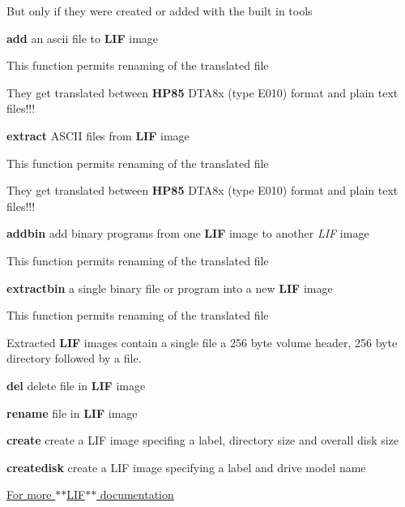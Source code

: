 \begin{DoxyItemize}
\begin{DoxyItemize}
\begin{DoxyItemize}
\begin{DoxyItemize}
\begin{DoxyItemize}
\item But only if they were created or added with the built in tools
\end{DoxyItemize}
\end{DoxyItemize}
\end{DoxyItemize}
\item {\bfseries add} an ascii file to {\bfseries L\+IF} image
\begin{DoxyItemize}
\item This function permits renaming of the translated file
\item They get translated between {\bfseries H\+P85} D\+T\+A8x (type E010) format and plain text files!!!
\end{DoxyItemize}
\item {\bfseries extract} A\+S\+C\+II files from {\bfseries L\+IF} image
\begin{DoxyItemize}
\item This function permits renaming of the translated file
\item They get translated between {\bfseries H\+P85} D\+T\+A8x (type E010) format and plain text files!!!
\end{DoxyItemize}
\item {\bfseries addbin} add binary programs from one {\bfseries L\+IF} image to another {\itshape L\+IF} image
\begin{DoxyItemize}
\item This function permits renaming of the translated file
\end{DoxyItemize}
\item {\bfseries extractbin} a single binary file or program into a new {\bfseries L\+IF} image
\begin{DoxyItemize}
\item This function permits renaming of the translated file
\item Extracted {\bfseries L\+IF} images contain a single file a 256 byte volume header, 256 byte directory followed by a file.
\end{DoxyItemize}
\item {\bfseries del} delete file in {\bfseries L\+IF} image
\item {\bfseries rename} file in {\bfseries L\+IF} image
\item {\bfseries create} create a L\+IF image specifing a label, directory size and overall disk size
\item {\bfseries createdisk} create a L\+IF image specifying a label and drive model name
\end{DoxyItemize}
\item \hyperlink{md_lif_README}{For more $\ast$$\ast$\+L\+I\+F$\ast$$\ast$ documentation}
\end{DoxyItemize}

